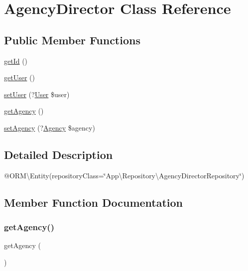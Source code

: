 \hypertarget{class_app_1_1_entity_1_1_agency_director}{}\section{Agency\+Director Class Reference}
\label{class_app_1_1_entity_1_1_agency_director}
\subsection*{Public Member Functions}
\begin{DoxyCompactItemize}
\item 
\mbox{\hyperlink{class_app_1_1_entity_1_1_agency_director_a12251d0c022e9e21c137a105ff683f13}{get\+Id}} ()
\item 
\mbox{\hyperlink{class_app_1_1_entity_1_1_agency_director_ae81b7186fb97a7c6457edcc68c9aa2ef}{get\+User}} ()
\item 
\mbox{\hyperlink{class_app_1_1_entity_1_1_agency_director_a406a111868b45aad6d4c8ab5b0c5bcb9}{set\+User}} (?\mbox{\hyperlink{class_app_1_1_entity_1_1_user}{User}} \$user)
\item 
\mbox{\hyperlink{class_app_1_1_entity_1_1_agency_director_a96f4e373af162c8fbc86093ec24f4340}{get\+Agency}} ()
\item 
\mbox{\hyperlink{class_app_1_1_entity_1_1_agency_director_aba5066bf731ebfd1dad6e18f82feef38}{set\+Agency}} (?\mbox{\hyperlink{class_app_1_1_entity_1_1_agency}{Agency}} \$agency)
\end{DoxyCompactItemize}


\subsection{Detailed Description}
@\+O\+RM\textbackslash{}\+Entity(repository\+Class=\char`\"{}\+App\textbackslash{}\+Repository\textbackslash{}\+Agency\+Director\+Repository\char`\"{}) 

\subsection{Member Function Documentation}
\mbox{\label{class_app_1_1_entity_1_1_agency_director_a96f4e373af162c8fbc86093ec24f4340}} 
\subsubsection{\texorpdfstring{getAgency()}{getAgency()}}
{\footnotesize\ttfamily get\+Agency (\begin{DoxyParamCaption}{ }\end{DoxyParamCaption})}

